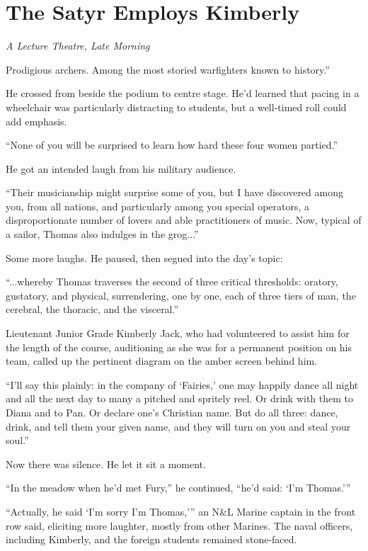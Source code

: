 \documentclass[11pt,a5paper]{article}
\newcommand{\alet}[1]{\textit{#1}\vspace{1em}}
\begin{document}
\section{The Satyr Employs Kimberly}

\alet{A Lecture Theatre, Late Morning}

 Prodigious archers. Among the most storied warfighters known to history.''

He crossed from beside the podium to centre stage. He'd learned that pacing in a wheelchair was particularly distracting to students, but a well-timed roll could add emphasis.

``None of you will be surprised to learn how hard these four women partied.''

He got an intended laugh from his military audience.

``Their musicianship might surprise some of you, but I have discovered among you, from all nations, and particularly among you special operators, a disproportionate number of lovers and able practitioners of music. Now, typical of a sailor, Thomas also indulges in the grog...''

Some more laughs. He paused, then segued into the day's topic:

``...whereby Thomas traverses the second of three critical thresholds: oratory, gustatory, and physical, surrendering, one by one, each of three tiers of man, the cerebral, the thoracic, and the visceral.''

Lieutenant Junior Grade Kimberly Jack, who had volunteered to assist him for the length of the course, auditioning as she was for a permanent position on his team, called up the pertinent diagram on the amber screen behind him.

``I'll say this plainly: in the company of `Fairies,' one may happily dance all night and all the next day to many a pitched and spritely reel. Or drink with them to Diana and to Pan. Or declare one's Christian name. But do all three: dance, drink, and tell them your given name, and they will turn on you and steal your soul.''

Now there was silence. He let it sit a moment.

``In the meadow when he'd met Fury,'' he continued, ``he'd said: `I'm Thomas.'''

``Actually, he said `I'm sorry I'm Thomas,''' an N\&L Marine captain in the front row said, eliciting more laughter, mostly from other Marines. The naval officers, including Kimberly, and the foreign students remained stone-faced.
\end{document}
